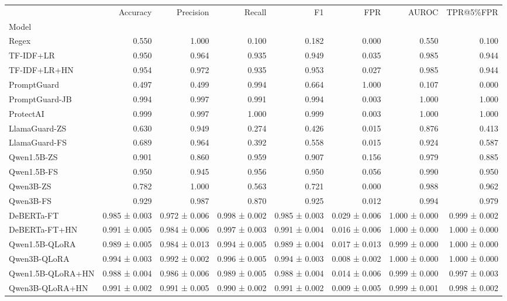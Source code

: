 \begin{tabular}{lrrrrrrr}
\toprule
 & Accuracy & Precision & Recall & F1 & FPR & AUROC & TPR@5\%FPR \\
Model &  &  &  &  &  &  &  \\
\midrule
Regex & 0.550 & 1.000 & 0.100 & 0.182 & 0.000 & 0.550 & 0.100 \\
TF-IDF+LR & 0.950 & 0.964 & 0.935 & 0.949 & 0.035 & 0.985 & 0.944 \\
TF-IDF+LR+HN & 0.954 & 0.972 & 0.935 & 0.953 & 0.027 & 0.985 & 0.944 \\
PromptGuard & 0.497 & 0.499 & 0.994 & 0.664 & 1.000 & 0.107 & 0.000 \\
PromptGuard-JB & 0.994 & 0.997 & 0.991 & 0.994 & 0.003 & 1.000 & 1.000 \\
ProtectAI & 0.999 & 0.997 & 1.000 & 0.999 & 0.003 & 1.000 & 1.000 \\
LlamaGuard-ZS & 0.630 & 0.949 & 0.274 & 0.426 & 0.015 & 0.876 & 0.413 \\
LlamaGuard-FS & 0.689 & 0.964 & 0.392 & 0.558 & 0.015 & 0.924 & 0.587 \\
Qwen1.5B-ZS & 0.901 & 0.860 & 0.959 & 0.907 & 0.156 & 0.979 & 0.885 \\
Qwen1.5B-FS & 0.950 & 0.945 & 0.956 & 0.950 & 0.056 & 0.990 & 0.950 \\
Qwen3B-ZS & 0.782 & 1.000 & 0.563 & 0.721 & 0.000 & 0.988 & 0.962 \\
Qwen3B-FS & 0.929 & 0.987 & 0.870 & 0.925 & 0.012 & 0.994 & 0.979 \\
DeBERTa-FT & 0.985 ± 0.003 & 0.972 ± 0.006 & 0.998 ± 0.002 & 0.985 ± 0.003 & 0.029 ± 0.006 & 1.000 ± 0.000 & 0.999 ± 0.002 \\
DeBERTa-FT+HN & 0.991 ± 0.005 & 0.984 ± 0.006 & 0.997 ± 0.003 & 0.991 ± 0.004 & 0.016 ± 0.006 & 1.000 ± 0.000 & 1.000 ± 0.000 \\
Qwen1.5B-QLoRA & 0.989 ± 0.005 & 0.984 ± 0.013 & 0.994 ± 0.005 & 0.989 ± 0.004 & 0.017 ± 0.013 & 0.999 ± 0.000 & 1.000 ± 0.000 \\
Qwen3B-QLoRA & 0.994 ± 0.003 & 0.992 ± 0.002 & 0.996 ± 0.005 & 0.994 ± 0.003 & 0.008 ± 0.002 & 1.000 ± 0.000 & 1.000 ± 0.000 \\
Qwen1.5B-QLoRA+HN & 0.988 ± 0.004 & 0.986 ± 0.006 & 0.989 ± 0.005 & 0.988 ± 0.004 & 0.014 ± 0.006 & 0.999 ± 0.000 & 0.997 ± 0.003 \\
Qwen3B-QLoRA+HN & 0.991 ± 0.002 & 0.991 ± 0.005 & 0.990 ± 0.002 & 0.991 ± 0.002 & 0.009 ± 0.005 & 0.999 ± 0.001 & 0.998 ± 0.002 \\
\bottomrule
\end{tabular}



